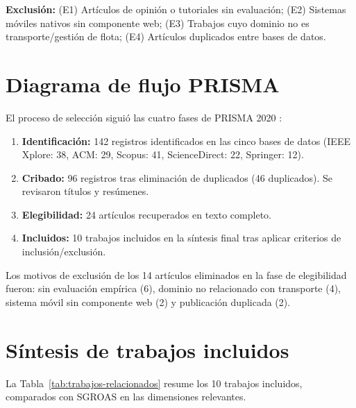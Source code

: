 \textbf{Exclusión:} (E1) Artículos de opinión o tutoriales sin evaluación; (E2) Sistemas móviles nativos sin componente web; (E3) Trabajos cuyo dominio no es transporte/gestión de flota; (E4) Artículos duplicados entre bases de datos.

\section{Diagrama de flujo PRISMA}
\label{sec:prisma}

El proceso de selección siguió las cuatro fases de PRISMA 2020 \cite{prisma2021}:

\begin{enumerate}
  \item \textbf{Identificación:} 142 registros identificados en las cinco bases de datos (IEEE Xplore: 38, ACM: 29, Scopus: 41, ScienceDirect: 22, Springer: 12).
  \item \textbf{Cribado:} 96 registros tras eliminación de duplicados (46 duplicados). Se revisaron títulos y resúmenes.
  \item \textbf{Elegibilidad:} 24 artículos recuperados en texto completo.
  \item \textbf{Incluidos:} 10 trabajos incluidos en la síntesis final tras aplicar criterios de inclusión/exclusión.
\end{enumerate}

Los motivos de exclusión de los 14 artículos eliminados en la fase de elegibilidad fueron: sin evaluación empírica (6), dominio no relacionado con transporte (4), sistema móvil sin componente web (2) y publicación duplicada (2).

\section{Síntesis de trabajos incluidos}
\label{sec:sintesis-trabajos}

La Tabla~\ref{tab:trabajos-relacionados} resume los 10 trabajos incluidos, comparados con SGROAS en las dimensiones relevantes.

